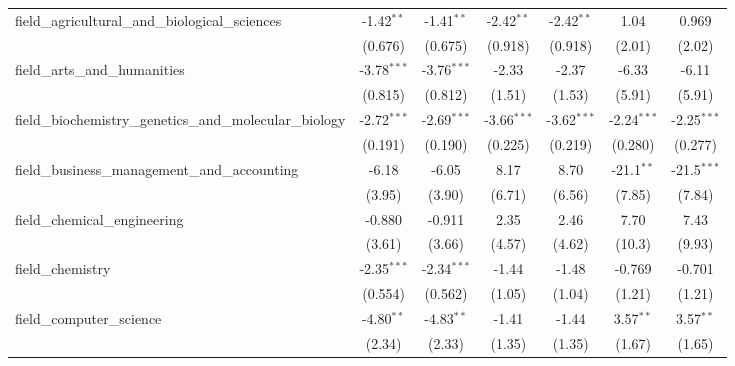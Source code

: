 \begin{tabular}{lcccccc}
   field\_agricultural\_and\_biological\_sciences              & -1.42$^{**}$  & -1.41$^{**}$  & -2.42$^{**}$  & -2.42$^{**}$  & 1.04          & 0.969\\   
                                                               & (0.676)       & (0.675)       & (0.918)       & (0.918)       & (2.01)        & (2.02)\\   
   field\_arts\_and\_humanities                                & -3.78$^{***}$ & -3.76$^{***}$ & -2.33         & -2.37         & -6.33         & -6.11\\   
                                                               & (0.815)       & (0.812)       & (1.51)        & (1.53)        & (5.91)        & (5.91)\\   
   field\_biochemistry\_genetics\_and\_molecular\_biology      & -2.72$^{***}$ & -2.69$^{***}$ & -3.66$^{***}$ & -3.62$^{***}$ & -2.24$^{***}$ & -2.25$^{***}$\\   
                                                               & (0.191)       & (0.190)       & (0.225)       & (0.219)       & (0.280)       & (0.277)\\   
   field\_business\_management\_and\_accounting                & -6.18         & -6.05         & 8.17          & 8.70          & -21.1$^{**}$  & -21.5$^{***}$\\   
                                                               & (3.95)        & (3.90)        & (6.71)        & (6.56)        & (7.85)        & (7.84)\\   
   field\_chemical\_engineering                                & -0.880        & -0.911        & 2.35          & 2.46          & 7.70          & 7.43\\   
                                                               & (3.61)        & (3.66)        & (4.57)        & (4.62)        & (10.3)        & (9.93)\\   
   field\_chemistry                                            & -2.35$^{***}$ & -2.34$^{***}$ & -1.44         & -1.48         & -0.769        & -0.701\\   
                                                               & (0.554)       & (0.562)       & (1.05)        & (1.04)        & (1.21)        & (1.21)\\   
   field\_computer\_science                                    & -4.80$^{**}$  & -4.83$^{**}$  & -1.41         & -1.44         & 3.57$^{**}$   & 3.57$^{**}$\\   
                                                               & (2.34)        & (2.33)        & (1.35)        & (1.35)        & (1.67)        & (1.65)\\   

\end{tabular}

